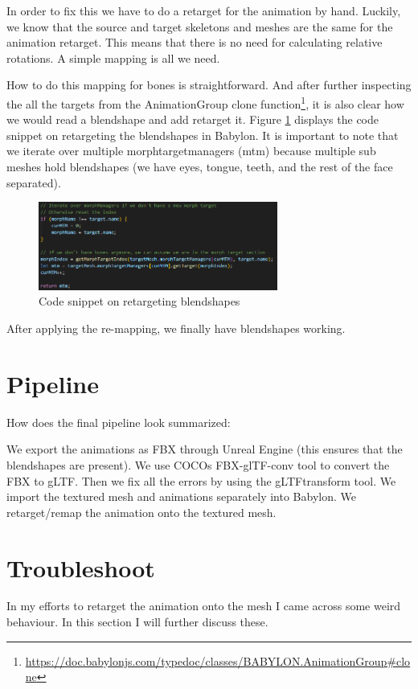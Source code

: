\documentclass{uva-inf-article}
\begin{document}
In order to fix this we have to do a retarget for the animation by hand. Luckily, we know that the source and target skeletons and meshes are the same for the animation retarget. This means that there is no need for calculating relative rotations. A simple mapping is all we need.

How to do this mapping for bones is straightforward\cite{babForum}. And after further inspecting the all the targets from the AnimationGroup clone function\footnote{\url{https://doc.babylonjs.com/typedoc/classes/BABYLON.AnimationGroup\#clone}}, it is also clear how we would read a blendshape and add retarget it.
Figure \ref{fig:mtm} displays the code snippet on retargeting the blendshapes in Babylon. It is important to note that we iterate over multiple morphtargetmanagers (mtm) because multiple sub meshes hold blendshapes (we have eyes, tongue, teeth, and the rest of the face separated).

\begin{figure}[hbt!]
    \centering
    \includegraphics[width=0.7\textwidth]{imgs/mtm.png}
    \caption{Code snippet on retargeting blendshapes}
    \label{fig:mtm}
\end{figure}

After applying the re-mapping, we finally have blendshapes working.

\section{Pipeline}
How does the final pipeline look summarized:
\begin{center}
We export the animations as FBX through Unreal Engine (this ensures that the blendshapes are present). We use COCOs FBX-glTF-conv tool to convert the FBX to gLTF. Then we fix all the errors by using the gLTFtransform tool. We import the textured mesh and animations separately into Babylon. We retarget/remap the animation onto the textured mesh.
\end{center}

\section{Troubleshoot}
In my efforts to retarget the animation onto the mesh I came across some weird behaviour. In this section I will further discuss these.
\end{document}
